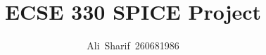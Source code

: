 \documentclass[journal]{IEEEtran}
\begin{document}
%
\title{ECSE 330 SPICE Project}
%
%
%

\author{Ali~Sharif~260681986}

% 
%



% 




\end{document}
